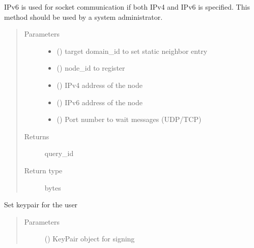 \documentclass[letterpaper,10pt,english]{sphinxmanual}
\begin{document}
\begin{fulllineitems}
\begin{fulllineitems}
IPv6 is used for socket communication if both IPv4 and IPv6 is specified.
This method should be used by a system administrator.
\begin{quote}\begin{description}
\item[{Parameters}] \leavevmode\begin{itemize}
\item {} 
 () \textendash{} target domain\_id to set static neighbor entry

\item {} 
 () \textendash{} node\_id to register

\item {} 
 () \textendash{} IPv4 address of the node

\item {} 
 () \textendash{} IPv6 address of the node

\item {} 
 () \textendash{} Port number to wait messages (UDP/TCP)

\end{itemize}

\item[{Returns}] \leavevmode
query\_id

\item[{Return type}] \leavevmode
bytes

\end{description}\end{quote}

\end{fulllineitems}


\begin{fulllineitems}
\label{\detokenize{bbc1.core.bbc_app:bbc1.core.bbc_app.BBcAppClient.set_keypair}}
Set keypair for the user
\begin{quote}\begin{description}
\item[{Parameters}] \leavevmode
{} ({\hyperref[\detokenize{bbc1.core.bbclib:bbc1.core.bbclib.KeyPair}]{}}) \textendash{} KeyPair object for signing


\end{description}
\end{quote}
\end{fulllineitems}
\end{fulllineitems}
\end{document}
